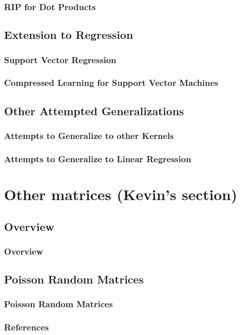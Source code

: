\documentclass[aspectratio=34]{beamer}
\begin{document}
\begin{frame}
    \frametitle{RIP for Dot Products}
\end{frame}

\subsection{Extension to Regression}

\begin{frame}
    \frametitle{Support Vector Regression}
\end{frame}

\begin{frame}
    \frametitle{Compressed Learning for Support Vector Machines}
\end{frame}

\subsection{Other Attempted Generalizations}

\begin{frame}
    \frametitle{Attempts to Generalize to other Kernels}
\end{frame}

\begin{frame}
    \frametitle{Attempts to Generalize to Linear Regression}
\end{frame}

\section{Other matrices (Kevin's section)}

\subsection{Overview}
\begin{frame}
    \frametitle{Overview}
\end{frame}

\subsection{Poisson Random Matrices}
\begin{frame}
    \frametitle{Poisson Random Matrices}
\end{frame}

\begin{frame}[t,allowframebreaks]{}
\frametitle{References}



\end{frame}
\end{document}
